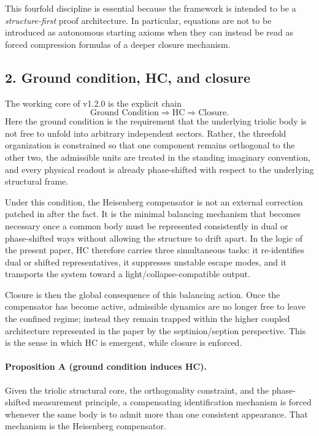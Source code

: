 This fourfold discipline is essential because the framework is intended to be a
\emph{structure-first} proof architecture. In particular, equations are not to
be introduced as autonomous starting axioms when they can instead be read as
forced compression formulas of a deeper closure mechanism.

\subsection*{2. Ground condition, HC, and closure}
The working core of v1.2.0 is the explicit chain
\[
\text{Ground Condition} \Longrightarrow \text{HC} \Longrightarrow \text{Closure}.
\]
Here the ground condition is the requirement that the underlying triolic body is
not free to unfold into arbitrary independent sectors. Rather, the threefold
organization is constrained so that one component remains orthogonal to the
other two, the admissible units are treated in the standing imaginary
convention, and every physical readout is already phase-shifted with respect to
the underlying structural frame.

Under this condition, the Heisenberg compensator is not an external correction
patched in after the fact. It is the minimal balancing mechanism that becomes
necessary once a common body must be represented consistently in dual or
phase-shifted ways without allowing the structure to drift apart. In the logic
of the present paper, HC therefore carries three simultaneous tasks: it
re-identifies dual or shifted representatives, it suppresses unstable escape
modes, and it transports the system toward a light/collapse-compatible output.

Closure is then the global consequence of this balancing action. Once the
compensator has become active, admissible dynamics are no longer free to leave
the confined regime; instead they remain trapped within the higher coupled
architecture represented in the paper by the septinion/seption perspective.
This is the sense in which HC is emergent, while closure is enforced.

\paragraph{Proposition A (ground condition induces HC).}
Given the triolic structural core, the orthogonality constraint, and the
phase-shifted measurement principle, a compensating identification mechanism is
forced whenever the same body is to admit more than one consistent appearance.
That mechanism is the Heisenberg compensator.

